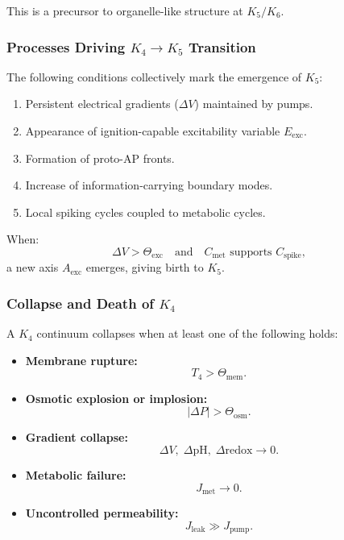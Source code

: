 This is a precursor to organelle-like structure at $K_5/K_6$.

\subsubsection{Processes Driving \texorpdfstring{$K_4 \to K_5$}{K_4 \to K_5} Transition}

The following conditions collectively mark the emergence of $K_5$:
\begin{enumerate}
    \item Persistent electrical gradients ($\Delta V$) maintained by pumps.
    \item Appearance of ignition-capable excitability variable 
    $E_{\text{exc}}$.
    \item Formation of proto-AP fronts.
    \item Increase of information-carrying boundary modes.
    \item Local spiking cycles coupled to metabolic cycles.
\end{enumerate}

When:
\[
\Delta V > \Theta_{\text{exc}}
\quad\text{and}\quad
C_\text{met} \text{ supports } C_\text{spike},
\]
a new axis $A_{\text{exc}}$ emerges, giving birth to $K_5$.

\subsubsection{Collapse and Death of \texorpdfstring{$K_4$}{K_4}}

A $K_4$ continuum collapses when at least one of the following holds:

\begin{itemize}
    \item \textbf{Membrane rupture:}
    \[
    T_4 > \Theta_{\text{mem}}.
    \]
    \item \textbf{Osmotic explosion or implosion:}
    \[
    |\Delta P| > \Theta_{\text{osm}}.
    \]
    \item \textbf{Gradient collapse:}
    \[
    \Delta V,\; \Delta \text{pH},\; \Delta \text{redox} \to 0.
    \]
    \item \textbf{Metabolic failure:}
    \[
    J_{\text{met}} \to 0.
    \]
    \item \textbf{Uncontrolled permeability:}
    \[
    J_{\text{leak}} \gg J_{\text{pump}}.
    \]
\end{itemize}

